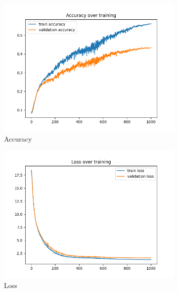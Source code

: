 \documentclass[a4paper]{article}
\begin{document}
\begin{figure}[h]
	\centering
	\begin{subfigure}{0.3\textwidth}
		\centering
		\includegraphics[width=\linewidth]{images/1000_it_default_acc.png}
		\caption{Accuracy}
	\end{subfigure}
	\begin{subfigure}{0.3\textwidth}
		\centering
		\includegraphics[width=\linewidth]{images/1000_it_default_loss.png}
		\caption{Loss}
	\end{subfigure}
	\begin{subfigure}{0.3\textwidth}
		\centering

\end{subfigure}
\end{figure}
\end{document}
